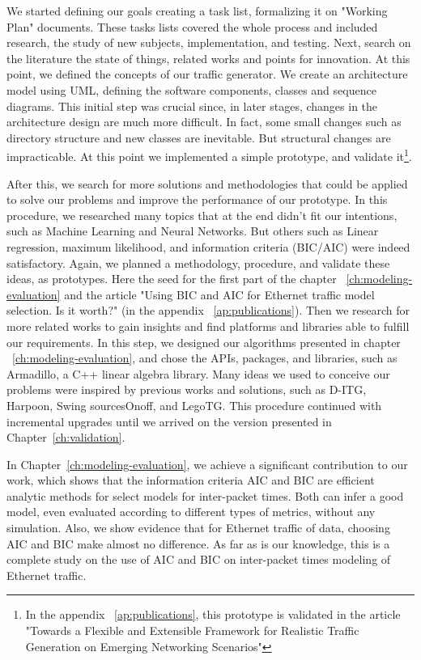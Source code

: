 We started defining our goals creating a task list, formalizing it on "Working Plan" documents. These tasks lists covered the whole process and included research, the study of new subjects, implementation, and testing. Next, search on the literature the state of things, related works and points for innovation. At this point, we defined the concepts of our traffic generator. We create an architecture model using UML, defining the software components, classes and sequence diagrams. This initial step was crucial since, in later stages, changes in the architecture design are much more difficult. In fact, some small changes such as directory structure and new classes are inevitable. But structural changes are impracticable. At this point we implemented a simple prototype, and validate it\footnote{In the appendix ~\ref{ap:publications}, this prototype is validated in the article "Towards a Flexible and Extensible Framework for Realistic Traffic Generation on Emerging Networking Scenarios"}. 


After this, we search for more solutions and methodologies that could be applied to solve our problems and improve the performance of our prototype. In this procedure, we researched many topics that at the end didn't fit our intentions, such as Machine Learning and Neural Networks. But others such as Linear regression, maximum likelihood, and information criteria (BIC/AIC) were indeed satisfactory. Again, we planned a methodology, procedure, and validate these ideas, as prototypes. Here the seed for the first part of the chapter ~\ref{ch:modeling-evaluation} and the article "Using BIC and AIC for Ethernet traffic model selection. Is it worth?" (in the appendix ~\ref{ap:publications}). Then we research for more related works to gain insights and find platforms and libraries able to fulfill our requirements. In this step, we designed our algorithms presented in chapter ~\ref{ch:modeling-evaluation}, and chose the APIs, packages, and libraries, such as Armadillo\cite{armadillo}, a C++ linear algebra library. Many ideas we used to conceive our problems were inspired by previous works and solutions, such as D-ITG\cite{ditg-paper}, Harpoon\cite{harpoon-validation}, Swing\cite{swing-paper} sourcesOnoff\cite{sourcesonoff-paper}, and LegoTG\cite{legotg-paper}. This procedure continued with incremental upgrades until we arrived on the version presented in Chapter~\ref{ch:validation}. 


In Chapter~\ref{ch:modeling-evaluation}, we achieve a significant contribution to our work, which shows that the information criteria AIC and BIC are efficient analytic methods for select models for inter-packet times. Both can infer a good model, even evaluated according to different types of metrics, without any simulation. Also, we show evidence that for Ethernet traffic of data, choosing AIC and BIC make almost no difference. As far as is our knowledge, this is a complete study on the use of AIC and BIC on inter-packet times modeling of Ethernet traffic.


